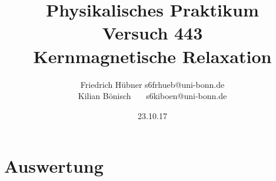 \documentclass{article}
\newcommand{\RM}[1]{\MakeUppercase{\romannumeral #1}}
\begin{document}
\setlength{\parindent}{0em}   %
\title{Physikalisches Praktikum \RM{4}\\Versuch 443\\Kernmagnetische Relaxation}
\author{Friedrich Hübner \qquad s6frhueb@uni-bonn.de \\
  Kilian Bönisch \ \ \ \qquad s6kiboen@uni-bonn.de }
\date{23.10.17}

\maketitle

\thispagestyle{empty}

\newpage







\section{Auswertung}



\newpage
\printbibliography
\end{document}
